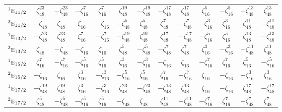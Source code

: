 \documentclass[10pt,a4paper]{article}
\numberwithin{equation}{section}
\newcommand{\irr}[1]{\text{\normalfont\scshape #1}}
\newcommand{\conjpair}[1]{{}^{#1}}
\newcommand{\rootunity}[1]{\zeta_{#1}}
\begin{document}
{\begin{longtable}{@{}lcccccccccccc@{}}
$\conjpair{1}\irr{e}_{11/2}$ & $\rootunity{48}^{23}$ & $-\rootunity{48}^{23}$ & $-\rootunity{16}^{7}$ & $\rootunity{16}^{7}$ & $\rootunity{48}^{19}$ & $-\rootunity{48}^{19}$ & $-\rootunity{48}^{17}$ & $\rootunity{48}^{17}$ & $\rootunity{16}^{5}$ & $-\rootunity{16}^{5}$ & $-\rootunity{48}^{13}$ & $\rootunity{48}^{13}$\\
$\conjpair{2}\irr{e}_{11/2}$ & $-\rootunity{48}$ & $\rootunity{48}$ & $\rootunity{16}$ & $-\rootunity{16}$ & $-\rootunity{48}^{5}$ & $\rootunity{48}^{5}$ & $\rootunity{48}^{7}$ & $-\rootunity{48}^{7}$ & $-\rootunity{16}^{3}$ & $\rootunity{16}^{3}$ & $\rootunity{48}^{11}$ & $-\rootunity{48}^{11}$\\
$\conjpair{1}\irr{e}_{13/2}$ & $-\rootunity{48}^{23}$ & $\rootunity{48}^{23}$ & $\rootunity{16}^{7}$ & $-\rootunity{16}^{7}$ & $-\rootunity{48}^{19}$ & $\rootunity{48}^{19}$ & $\rootunity{48}^{17}$ & $-\rootunity{48}^{17}$ & $-\rootunity{16}^{5}$ & $\rootunity{16}^{5}$ & $\rootunity{48}^{13}$ & $-\rootunity{48}^{13}$\\
$\conjpair{2}\irr{e}_{13/2}$ & $\rootunity{48}$ & $-\rootunity{48}$ & $-\rootunity{16}$ & $\rootunity{16}$ & $\rootunity{48}^{5}$ & $-\rootunity{48}^{5}$ & $-\rootunity{48}^{7}$ & $\rootunity{48}^{7}$ & $\rootunity{16}^{3}$ & $-\rootunity{16}^{3}$ & $-\rootunity{48}^{11}$ & $\rootunity{48}^{11}$\\
$\conjpair{1}\irr{e}_{15/2}$ & $\rootunity{16}^{7}$ & $-\rootunity{16}^{7}$ & $-\rootunity{16}^{5}$ & $\rootunity{16}^{5}$ & $\rootunity{16}^{3}$ & $-\rootunity{16}^{3}$ & $-\rootunity{16}$ & $\rootunity{16}$ & $-\rootunity{16}^{7}$ & $\rootunity{16}^{7}$ & $\rootunity{16}^{5}$ & $-\rootunity{16}^{5}$\\
$\conjpair{2}\irr{e}_{15/2}$ & $-\rootunity{16}$ & $\rootunity{16}$ & $\rootunity{16}^{3}$ & $-\rootunity{16}^{3}$ & $-\rootunity{16}^{5}$ & $\rootunity{16}^{5}$ & $\rootunity{16}^{7}$ & $-\rootunity{16}^{7}$ & $\rootunity{16}$ & $-\rootunity{16}$ & $-\rootunity{16}^{3}$ & $\rootunity{16}^{3}$\\
$\conjpair{1}\irr{e}_{17/2}$ & $-\rootunity{48}^{19}$ & $\rootunity{48}^{19}$ & $\rootunity{16}^{3}$ & $-\rootunity{16}^{3}$ & $\rootunity{48}^{23}$ & $-\rootunity{48}^{23}$ & $-\rootunity{48}^{13}$ & $\rootunity{48}^{13}$ & $\rootunity{16}$ & $-\rootunity{16}$ & $\rootunity{48}^{17}$ & $-\rootunity{48}^{17}$\\
$\conjpair{2}\irr{e}_{17/2}$ & $\rootunity{48}^{5}$ & $-\rootunity{48}^{5}$ & $-\rootunity{16}^{5}$ & $\rootunity{16}^{5}$ & $-\rootunity{48}$ & $\rootunity{48}$ & $\rootunity{48}^{11}$ & $-\rootunity{48}^{11}$ & $-\rootunity{16}^{7}$ & $\rootunity{16}^{7}$ & $-\rootunity{48}^{7}$ & $\rootunity{48}^{7}$\\

\end{longtable}}
\end{document}
